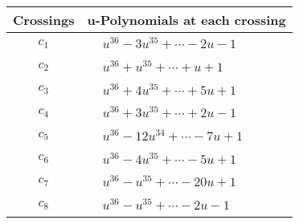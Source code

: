 \documentclass[1p]{elsarticle_modified}
\theoremstyle{definition}
\begin{document}
\begin{tabular}{m{50pt}|m{274pt}}
Crossings & \hspace{64pt}u-Polynomials at each crossing \\
\hline $$\begin{aligned}c_{1}\end{aligned}$$&$\begin{aligned}
&u^{36}-3 u^{35}+\cdots-2 u-1
\end{aligned}$\\
\hline $$\begin{aligned}c_{2}\end{aligned}$$&$\begin{aligned}
&u^{36}+u^{35}+\cdots+u+1
\end{aligned}$\\
\hline $$\begin{aligned}c_{3}\end{aligned}$$&$\begin{aligned}
&u^{36}+4 u^{35}+\cdots+5 u+1
\end{aligned}$\\
\hline $$\begin{aligned}c_{4}\end{aligned}$$&$\begin{aligned}
&u^{36}+3 u^{35}+\cdots+2 u-1
\end{aligned}$\\
\hline $$\begin{aligned}c_{5}\end{aligned}$$&$\begin{aligned}
&u^{36}-12 u^{34}+\cdots-7 u+1
\end{aligned}$\\
\hline $$\begin{aligned}c_{6}\end{aligned}$$&$\begin{aligned}
&u^{36}-4 u^{35}+\cdots-5 u+1
\end{aligned}$\\
\hline $$\begin{aligned}c_{7}\end{aligned}$$&$\begin{aligned}
&u^{36}- u^{35}+\cdots-20 u+1
\end{aligned}$\\
\hline $$\begin{aligned}c_{8}\end{aligned}$$&$\begin{aligned}
&u^{36}- u^{35}+\cdots-2 u-1
\end{aligned}$\\

\end{tabular}
\end{document}
